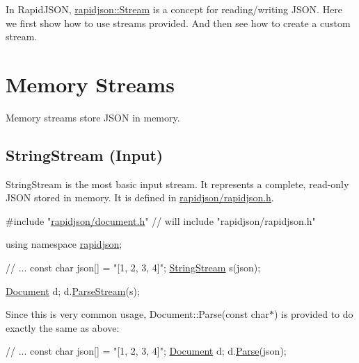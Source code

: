 In Rapid\+J\+S\+ON, {\ttfamily \hyperlink{classrapidjson_1_1_stream}{rapidjson\+::\+Stream}} is a concept for reading/writing J\+S\+ON. Here we first show how to use streams provided. And then see how to create a custom stream.\hypertarget{md_Cadriciel_Commun_Externe_RapidJSON_doc_stream.zh-cn_MemoryStreams}{}\section{Memory Streams}\label{md_Cadriciel_Commun_Externe_RapidJSON_doc_stream.zh-cn_MemoryStreams}
Memory streams store J\+S\+ON in memory.\hypertarget{md_Cadriciel_Commun_Externe_RapidJSON_doc_stream.zh-cn_StringStream}{}\subsection{String\+Stream (\+Input)}\label{md_Cadriciel_Commun_Externe_RapidJSON_doc_stream.zh-cn_StringStream}
{\ttfamily String\+Stream} is the most basic input stream. It represents a complete, read-\/only J\+S\+ON stored in memory. It is defined in {\ttfamily \hyperlink{rapidjson_8h}{rapidjson/rapidjson.\+h}}.


\begin{DoxyCode}
\textcolor{preprocessor}{#include "\hyperlink{document_8h}{rapidjson/document.h}"} \textcolor{comment}{// will include "rapidjson/rapidjson.h"}

\textcolor{keyword}{using namespace }\hyperlink{namespacerapidjson}{rapidjson};

\textcolor{comment}{// ...}
\textcolor{keyword}{const} \textcolor{keywordtype}{char} json[] = \textcolor{stringliteral}{"[1, 2, 3, 4]"};
\hyperlink{struct_generic_string_stream}{StringStream} s(json);

\hyperlink{class_generic_document}{Document} d;
d.\hyperlink{class_generic_document_afe94c0abc83a20f2d7dc1ba7677e6238}{ParseStream}(s);
\end{DoxyCode}


Since this is very common usage, {\ttfamily Document\+::\+Parse(const char$\ast$)} is provided to do exactly the same as above\+:


\begin{DoxyCode}
\textcolor{comment}{// ...}
\textcolor{keyword}{const} \textcolor{keywordtype}{char} json[] = \textcolor{stringliteral}{"[1, 2, 3, 4]"};
\hyperlink{class_generic_document}{Document} d;
d.\hyperlink{class_generic_document_aebd4e7fddd80c1e1174837aee6d2159b}{Parse}(json);
\end{DoxyCode}


